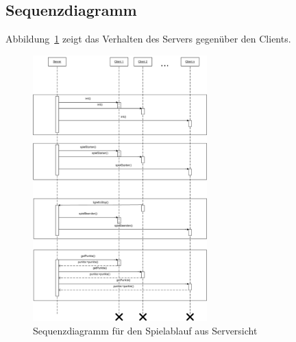 \newpage
 
\subsection{Sequenzdiagramm}

Abbildung~\ref{SequenzdiagramServer} zeigt das Verhalten des Servers gegenüber den Clients. 

 \begin{figure}[hbt]
  \centering
  \includegraphics[width=0.60\textwidth,angle=0]{graphics/Spielablauf_Sequenzdiagramm.png}
  \caption{Sequenzdiagramm für den Spielablauf aus Serversicht \hfill{} }
  \label{SequenzdiagramServer}
 \end{figure}

